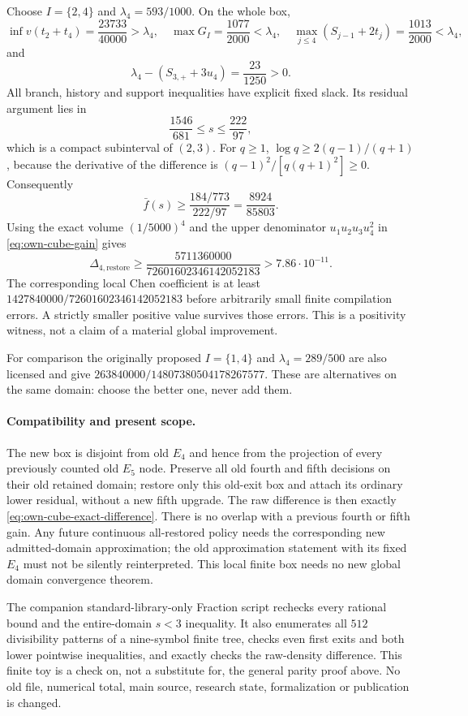 Choose $I=\{2,4\}$ and $\lambda_4=593/1000$. On the whole box,
\[
 \inf v(t_2+t_4)=\frac{23733}{40000}>\lambda_4,
 \quad \max G_I=\frac{1077}{2000}<\lambda_4,
 \quad \max_{j\le4}(S_{j-1}+2t_j)=\frac{1013}{2000}<\lambda_4,
\]
and
\[
 \lambda_4-(S_{3,+}+3u_4)=\frac{23}{1250}>0.
\]
All branch, history and support inequalities have explicit fixed
slack. Its residual argument lies in
\[
 \frac{1546}{681}\le s\le\frac{222}{97},
\]
which is a compact subinterval of $(2,3)$. For $q\ge1$,
$\log q\ge2(q-1)/(q+1)$, because the derivative of the difference
is $(q-1)^2/[q(q+1)^2]\ge0$. Consequently
\[
 \bar f(s)\ge\frac{184/773}{222/97}=\frac{8924}{85803}.
\]
Using the exact volume $(1/5000)^4$ and the upper denominator
$u_1u_2u_3u_4^2$ in \eqref{eq:own-cube-gain} gives
\[
 \boxed{\displaystyle
 \Delta_{4,\mathrm{restore}}\ge
 \frac{5711360000}{72601602346142052183}
 >7.86\cdot10^{-11}.}
\]
The corresponding local Chen coefficient is at least
$1427840000/72601602346142052183$ before arbitrarily small finite
compilation errors. A strictly smaller positive value survives
those errors. This is a positivity witness, not a claim of a
material global improvement.

For comparison the originally proposed $I=\{1,4\}$ and
$\lambda_4=289/500$ are also licensed and give
$263840000/14807380504178267577$. These are alternatives on the
same domain: choose the better one, never add them.

\paragraph{Compatibility and present scope.}
The new box is disjoint from old $E_4$ and hence from the projection
of every previously counted old $E_5$ node. Preserve all old fourth
and fifth decisions on their old retained domain; restore only this
old-exit box and attach its ordinary lower residual, without a new
fifth upgrade. The raw difference is then exactly
\eqref{eq:own-cube-exact-difference}. There is no overlap with a
previous fourth or fifth gain. Any future continuous all-restored
policy needs the corresponding new admitted-domain approximation;
the old approximation statement with its fixed $E_4$ must not be
silently reinterpreted. This local finite box needs no new global
domain convergence theorem.

The companion standard-library-only Fraction script rechecks every
rational bound and the entire-domain $s<3$ inequality. It also
enumerates all $512$ divisibility patterns of a nine-symbol finite
tree, checks even first exits and both lower pointwise inequalities,
and exactly checks the raw-density difference. This finite toy is
a check on, not a substitute for, the general parity proof above.
No old file, numerical total, main source, research state,
formalization or publication is changed.
